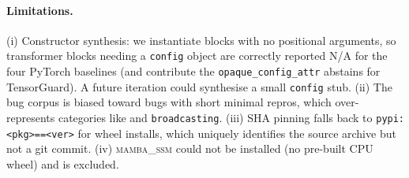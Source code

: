 \paragraph{Limitations.}
(i) Constructor synthesis: we instantiate blocks with no positional
arguments, so transformer blocks needing a \texttt{config} object are
correctly reported \textsc{N/A} for the four PyTorch baselines (and
contribute the \texttt{opaque\_config\_attr} abstains for TensorGuard).
A future iteration could synthesise a small \texttt{config} stub.
(ii) The bug corpus is biased toward bugs with short minimal repros,
which over-represents categories like and
\texttt{broadcasting}. (iii) SHA pinning falls back to
\texttt{pypi:<pkg>==<ver>} for wheel installs, which uniquely identifies
the source archive but not a git commit. (iv) \textsc{mamba\_ssm} could
not be installed (no pre-built CPU wheel) and is excluded.
